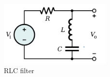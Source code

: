 \begin{figure}[!h]
	\centering
	\includegraphics[width=0.5\textwidth]{Bilder/Band-Reject_Filter.svg.png}
	\caption{RLC filter}
	\label{fig:fig2}
\end{figure}

